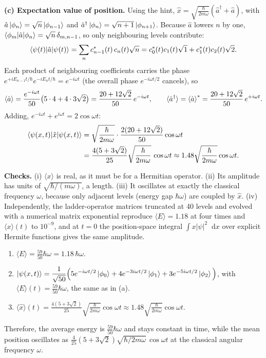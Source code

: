 \documentclass[12pt]{article}
\renewcommand{\d}{\mathop{}\!\mathrm{d}}
\begin{document}
\begin{solutionbox}
\textbf{(c) Expectation value of position.} Using the hint, $\hat x=\sqrt{\frac{\hbar}{2m\omega}}(\hat a^\dagger+\hat a)$, with $\hat a\ket{\phi_n}=\sqrt n\ket{\phi_{n-1}}$ and $\hat a^\dagger\ket{\phi_n}=\sqrt{n+1}\ket{\phi_{n+1}}$. Because $\hat a$ lowers $n$ by one, $\braket{\phi_m|\hat a|\phi_n}=\sqrt n\,\delta_{m,n-1}$, so only neighbouring levels contribute:
\[
\braket{\psi(t)|\hat a|\psi(t)}=\sum_n c_{n-1}^*(t)\,c_n(t)\sqrt n
=c_0^*(t)c_1(t)\sqrt1+c_1^*(t)c_2(t)\sqrt2 .
\]
Each product of neighbouring coefficients carries the phase $e^{+iE_{n-1}t/\hbar}e^{-iE_nt/\hbar}=e^{-i\omega t}$ (the overall phase $e^{-i\omega t/2}$ cancels), so
\[
\braket{\hat a}=\frac{e^{-i\omega t}}{50}\big(5\cdot4+4\cdot3\sqrt2\big)=\frac{20+12\sqrt2}{50}\,e^{-i\omega t},
\qquad
\braket{\hat a^\dagger}=\braket{\hat a}^*=\frac{20+12\sqrt2}{50}\,e^{+i\omega t}.
\]
Adding, $e^{-i\omega t}+e^{i\omega t}=2\cos\omega t$:
\begin{align*}
\braket{\psi(x,t)|\hat x|\psi(x,t)}&=\sqrt{\frac{\hbar}{2m\omega}}\cdot\frac{2(20+12\sqrt2)}{50}\cos\omega t\\
&=\frac{4(5+3\sqrt2)}{25}\sqrt{\frac{\hbar}{2m\omega}}\,\cos\omega t\approx1.48\sqrt{\frac{\hbar}{2m\omega}}\cos\omega t .
\end{align*}

\textbf{Checks.} (i) $\langle x\rangle$ is real, as it must be for a Hermitian operator. (ii) Its amplitude has units of $\sqrt{\hbar/(m\omega)}$, a length. (iii) It oscillates at exactly the classical frequency $\omega$, because only adjacent levels (energy gap $\hbar\omega$) are coupled by $\hat x$. (iv) Independently, the ladder-operator matrices truncated at 40 levels and evolved with a numerical matrix exponential reproduce $\langle E\rangle=1.18$ at four times and $\langle x\rangle(t)$ to $10^{-9}$, and at $t=0$ the position-space integral $\int x|\psi|^2\d x$ over explicit Hermite functions gives the same amplitude.
\end{solutionbox}

\begin{answerbox}
\begin{enumerate}[label=(\alph*)]
\item $\displaystyle\langle E\rangle=\frac{59}{50}\hbar\omega=1.18\,\hbar\omega$.
\item $\displaystyle\ket{\psi(x,t)}=\frac{1}{\sqrt{50}}\Big(5e^{-i\omega t/2}\ket{\phi_0}+4e^{-3i\omega t/2}\ket{\phi_1}+3e^{-5i\omega t/2}\ket{\phi_2}\Big)$, with $\displaystyle\langle E\rangle(t)=\frac{59}{50}\hbar\omega$, the same as in (a).
\item $\displaystyle\langle\hat x\rangle(t)=\frac{4(5+3\sqrt2)}{25}\sqrt{\frac{\hbar}{2m\omega}}\cos\omega t\approx1.48\sqrt{\frac{\hbar}{2m\omega}}\cos\omega t$.
\end{enumerate}
Therefore, the average energy is $\frac{59}{50}\hbar\omega$ and stays constant in time, while the mean position oscillates as $\tfrac{4}{25}(5+3\sqrt2)\sqrt{\hbar/2m\omega}\,\cos\omega t$ at the classical angular frequency $\omega$.
\end{answerbox}
\end{document}

